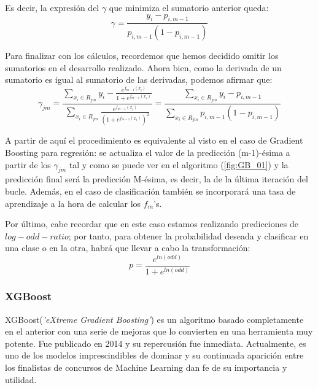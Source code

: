 \documentclass[12pt,twoside]{article}
\begin{document}
Es decir, la expresión del $\gamma$ que minimiza el sumatorio anterior queda:
\begin{equation*}
\gamma = \frac{y_i - p_{i, m-1}}{p_{i, m-1}(1 - p_{i, m-1})}
\end{equation*}

Para finalizar con los cálculos, recordemos que hemos decidido omitir los sumatorios en el desarrollo realizado. Ahora bien, como la derivada de un sumatorio es igual al sumatorio de las derivadas, podemos afirmar que:
\begin{equation*}
\gamma_{jm} = \frac{\displaystyle \sum_{x_i \in R_{jm}} y_i - \frac{e^{f_{m-1}(x_i)}}{1 + e^{f_{m-1}(x_i)}}}{\displaystyle \sum_{x_i \in R_{jm}} \frac{e^{f_{m-1}(x_i)}}{(1 + e^{f_{m-1}(x_i)})^2}} = \frac{\displaystyle \sum_{x_i \in R_{jm}} y_i - p_{i, m-1}}{\displaystyle \sum_{x_i \in R_{jm}} p_{i, m-1}(1 - p_{i, m-1})}
\end{equation*}

A partir de aquí el procedimiento es equivalente al visto en el caso de Gradient Boosting para regresión: se actualiza el valor de la predicción (m-1)-ésima a partir de los $\gamma_{jm}$ tal y como se puede ver en el algoritmo (\ref{fig:GB_01}) y la predicción final será la predicción M-ésima, es decir, la de la última iteración del bucle. Además, en el caso de clasificación también se incorporará una tasa de aprendizaje a la hora de calcular los $f_m$'s.

Por último, cabe recordar que en este caso estamos realizando predicciones de $log-odd-ratio$; por tanto, para obtener la probabilidad deseada y clasificar en una clase o en la otra, habrá que llevar a cabo la transformación:
\begin{equation*}
p = \frac{e^{ln(odd)}}{1 + e^{ln(odd)}}
\end{equation*}





\subsubsection{XGBoost} \label{sec:XGBoost}
XGBoost(\textit{'eXtreme Gradient Boosting'}) es un algoritmo basado completamente en el anterior con una serie de mejoras que lo convierten en una herramienta muy potente. Fue publicado en 2014 y su repercusión fue inmediata. Actualmente, es uno de los modelos imprescindibles de dominar y su continuada aparición entre los finalistas de concursos de Machine Learning dan fe de su importancia y utilidad.
\end{document}
